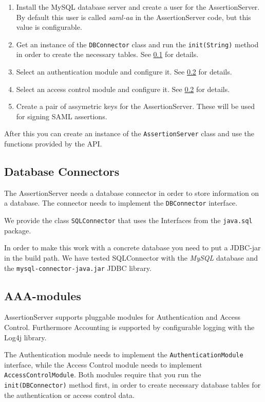 \documentclass[10pt,a4paper]{article}
\begin{document}
\begin{enumerate}
  \item Install the MySQL database server and create a user for the 
    AssertionServer. By default this user is called \emph{saml-aa} in
    the AssertionServer code, but this value is configurable.
  \item Get an instance of the \texttt{DBConnector} class and run the 
    \texttt{init(String)} method in order to create the necessary tables. 
    See \ref{DBConnector} for details.
  \item Select an authentication module and configure it. See \ref{AAA} for
    details.
  \item Select an access control module and configure it. See \ref{AAA} for 
    details.
  \item Create a pair of assymetric keys for the AssertionServer. These will
    be used for signing SAML assertions.
\end{enumerate}

After this you can create an instance of the \texttt{AssertionServer} class and
use the functions provided by the API.

\subsection{Database Connectors}\label{DBConnector}
The AssertionServer needs a database connector in order to store information
on a database. The connector needs to implement the \texttt{DBConnector}
interface.

We provide the class \texttt{SQLConnector} that uses the Interfaces from the 
\texttt{java.sql} package. 

In order to make this work with a concrete database you need to put a JDBC-jar
in the build path. We have tested SQLConnector with the \emph{MySQL} database 
and the \texttt{mysql-connector-java.jar} JDBC library.

\subsection{AAA-modules}\label{AAA}
AssertionServer supports pluggable modules for Authentication and Access 
Control. Furthermore Accounting is supported by configurable logging 
with the Log4j library.

The Authentication module needs to implement the \texttt{AuthenticationModule}
interface, while the Access Control module needs to implement 
\texttt{AccessControlModule}. Both modules require that you run the 
\texttt{init(DBConnector)} method first, in order to create necessary database
tables for the authentication or access control data.
\end{document}
